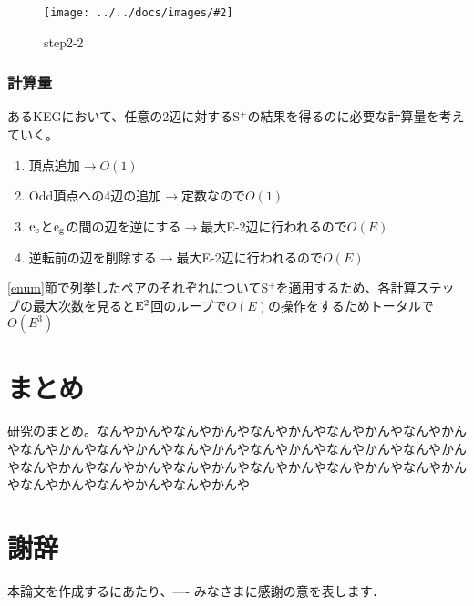 \documentclass[11pt,a4j]{jarticle}
\newcommand{\splus}{S${}^\text{+}$}
\newcommand{\f}[1]{$\rm{#1}$} %
\newcommand{\image}[4][height=100pt]{%
\begin{figure}[htbp]
    \centering
    \texttt{[image: ../../docs/images/\#2]}
    \caption{#3}
    \label{fig:#4}
\end{figure}%
}
\newcommand{\ra }{$\rightarrow$}
\begin{document}
\image{step2_2.jpg}{step2-2}{step2-2}

\subsubsection{計算量}
あるKEGにおいて、任意の2辺に対する\splus の結果を得るのに必要な計算量を考えていく。

\begin{enumerate}
    \item 頂点追加\ra  $O(1)$
    \item Odd頂点への4辺の追加\ra 定数なので$O(1)$
    \item \f{e_s}と\f{e_g}の間の辺を逆にする\ra 最大E-2辺に行われるので$O(E)$
    \item 逆転前の辺を削除する\ra 最大E-2辺に行われるので$O(E)$
\end{enumerate}

\ref{enum}節で列挙したペアのそれぞれについて\splus を適用するため、各計算ステップの最大次数を見ると\f{E^2}回のループで$O(E)$の操作をするためトータルで$O(E^3)$

\section{まとめ}
研究のまとめ。なんやかんやなんやかんやなんやかんやなんやかんやなんやかんやなんやかんやなんやかんやなんやかんやなんやかんやなんやかんやなんやかんやなんやかんやなんやかんやなんやかんやなんやかんやなんやかんやなんやかんやなんやかんやなんやかんやなんやかんや

\section*{謝辞} %
本論文を作成するにあたり、---- みなさまに感謝の意を表します．


\end{document}

